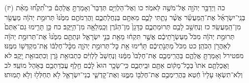 \documentclass[twoside, openany, parskip=half, 11pt]{book}
\begin{document}
(יז) כה וַיְדַבֵּ֥ר יְהֹוָ֖ה אֶל־מֹשֶׁ֥ה לֵּאמֹֽר׃ כו וְאֶל־הַלְוִיִּ֣ם תְּדַבֵּר֮ וְאָמַרְתָּ֣ אֲלֵהֶם֒ כִּֽי־תִ֠קְח֠וּ מֵאֵ֨ת בְּנֵֽי־יִשְׂרָאֵ֜ל אֶת־הַֽמַּעֲשֵׂ֗ר אֲשֶׁ֨ר נָתַ֧תִּי לָכֶ֛ם מֵאִתָּ֖ם בְּנַחֲלַתְכֶ֑ם וַהֲרֵמֹתֶ֤ם מִמֶּ֙נּוּ֙ תְּרוּמַ֣ת יְהֹוָ֔ה מַעֲשֵׂ֖ר מִן־הַֽמַּעֲשֵֽׂר׃ כז וְנֶחְשַׁ֥ב לָכֶ֖ם תְּרוּמַתְכֶ֑ם כַּדָּגָן֙ מִן־הַגֹּ֔רֶן וְכַֽמְלֵאָ֖ה מִן־הַיָּֽקֶב׃ כח כֵּ֣ן תָּרִ֤ימוּ גַם־אַתֶּם֙ תְּרוּמַ֣ת יְהֹוָ֔ה מִכֹּל֙ מַעְשְׂרֹ֣תֵיכֶ֔ם אֲשֶׁ֣ר תִּקְח֔וּ מֵאֵ֖ת בְּנֵ֣י יִשְׂרָאֵ֑ל וּנְתַתֶּ֤ם מִמֶּ֙נּוּ֙ אֶת־תְּרוּמַ֣ת יְהֹוָ֔ה לְאַהֲרֹ֖ן הַכֹּהֵֽן׃ כט מִכֹּל֙ מַתְּנֹ֣תֵיכֶ֔ם תָּרִ֕ימוּ אֵ֖ת כׇּל־תְּרוּמַ֣ת יְהֹוָ֑ה מִכׇּ֨ל־חֶלְבּ֔וֹ אֶֽת־מִקְדְּשׁ֖וֹ מִמֶּֽנּוּ׃ מפטירל וְאָמַרְתָּ֖ אֲלֵהֶ֑ם בַּהֲרִֽימְכֶ֤ם אֶת־חֶלְבּוֹ֙ מִמֶּ֔נּוּ וְנֶחְשַׁב֙ לַלְוִיִּ֔ם כִּתְבוּאַ֥ת גֹּ֖רֶן וְכִתְבוּאַ֥ת יָֽקֶב׃ לא וַאֲכַלְתֶּ֤ם אֹתוֹ֙ בְּכׇל־מָק֔וֹם אַתֶּ֖ם וּבֵֽיתְכֶ֑ם כִּֽי־שָׂכָ֥ר הוּא֙ לָכֶ֔ם חֵ֥לֶף עֲבֹֽדַתְכֶ֖ם בְּאֹ֥הֶל מוֹעֵֽד׃ לב וְלֹֽא־תִשְׂא֤וּ עָלָיו֙ חֵ֔טְא בַּהֲרִֽימְכֶ֥ם אֶת־חֶלְבּ֖וֹ מִמֶּ֑נּוּ וְאֶת־קׇדְשֵׁ֧י בְנֵי־יִשְׂרָאֵ֛ל לֹ֥א תְחַלְּל֖וּ וְלֹ֥א תָמֽוּתוּ׃
\end{document}
